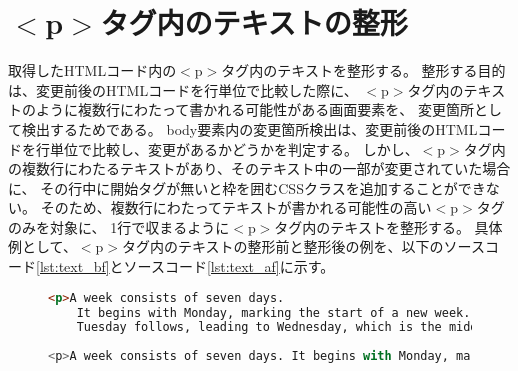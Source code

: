 \section{\texorpdfstring{$<$p$>$タグ内のテキストの整形}{pタグ内のテキストの整形}}\label{sec:text_change}
取得したHTMLコード内の$<$p$>$タグ内のテキストを整形する。
整形する目的は、変更前後のHTMLコードを行単位で比較した際に、
$<$p$>$タグ内のテキストのように複数行にわたって書かれる可能性がある画面要素を、
変更箇所として検出するためである。
body要素内の変更箇所検出は、変更前後のHTMLコードを行単位で比較し、変更があるかどうかを判定する。
しかし、$<$p$>$タグ内の複数行にわたるテキストがあり、そのテキスト中の一部が変更されていた場合に、
その行中に開始タグが無いと枠を囲むCSSクラスを追加することができない。
そのため、複数行にわたってテキストが書かれる可能性の高い$<$p$>$タグのみを対象に、
1行で収まるように$<$p$>$タグ内のテキストを整形する。
具体例として、$<$p$>$タグ内のテキストの整形前と整形後の例を、以下のソースコード\ref{lst:text_bf}とソースコード\ref{lst:text_af}に示す。
\begin{figure}[tp]
      \begin{lstlisting}[language=HTML, caption=$<$p$>$タグ内のテキストの整形前の例, label=lst:text_bf]
<p>A week consists of seven days. 
    It begins with Monday, marking the start of a new week. 
    Tuesday follows, leading to Wednesday, which is the middle of the week. </p>
\end{lstlisting}
\end{figure}

\begin{figure}[tp]
      \begin{lstlisting}[language=Python, caption=$<$p$>$タグ内のテキストの整形後の例, label=lst:text_af]
<p>A week consists of seven days. It begins with Monday, marking the start of a new week. Tuesday follows, leading to Wednesday, which is the middle of the week. </p>
\end{lstlisting}
\end{figure}


